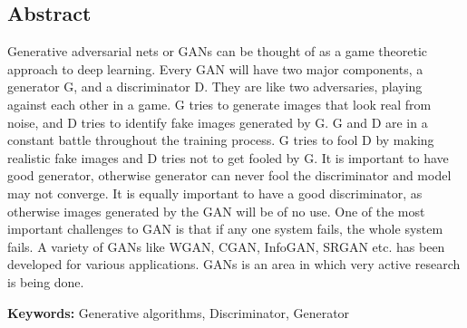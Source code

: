 \begin{center}
    \section*{Abstract}
    \justify
    \begin{doublespace}
    Generative adversarial nets or GANs can be thought of as a game theoretic 
    approach to deep learning. Every GAN will have two major components, 
    a generator G, and a discriminator D. They are like two adversaries, playing 
    against each other in a game. G tries to generate images that look real from 
    noise, and D tries to identify fake images generated by G. G and D are in a 
    constant battle throughout the training process. G tries to fool D by making 
    realistic fake images and D tries not to get fooled by G. It is important to 
    have good generator, otherwise generator can never fool the discriminator 
    and model may not converge. It is equally important to have a good 
    discriminator, as otherwise images generated by the GAN will be of no use. 
    One of the most important challenges to GAN is that if any one system fails, 
    the whole system fails. A variety of GANs like WGAN, CGAN, InfoGAN, SRGAN 
    etc. has been developed for various applications. GANs is an area in which 
    very active research is being done.
    
    \noindent\textbf{Keywords:} Generative algorithms, Discriminator, Generator
    \end{doublespace}
\end{center}
